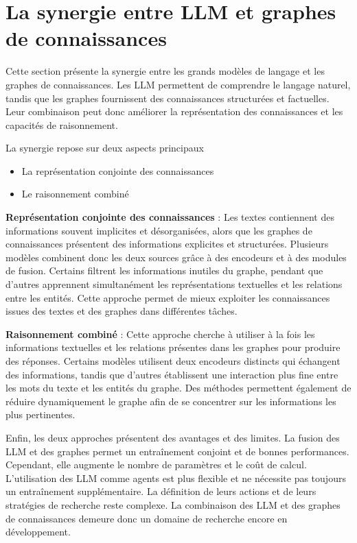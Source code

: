 \documentclass[12pt,a4paper]{report}
\begin{document}
\section{La synergie entre LLM et graphes de connaissances}
Cette section présente la synergie entre les grands modèles de langage et les graphes de 
connaissances. Les LLM permettent de comprendre le langage naturel, tandis que les graphes 
fournissent des connaissances structurées et factuelles. Leur combinaison peut donc améliorer 
la représentation des connaissances et les capacités de raisonnement.

La synergie repose sur deux aspects principaux 
\begin{itemize}
    \item La représentation conjointe des connaissances 
    \item Le raisonnement combiné
\end{itemize}

\textbf{Représentation conjointe des connaissances} :
Les textes contiennent des informations souvent implicites et désorganisées, 
alors que les graphes de connaissances présentent des informations explicites 
et structurées. Plusieurs modèles combinent donc les deux sources grâce à des 
encodeurs et à des modules de fusion. Certains filtrent les informations inutiles 
du graphe, pendant que d'autres apprennent simultanément les représentations textuelles 
et les relations entre les entités. Cette approche permet de mieux exploiter les 
connaissances issues des textes et des graphes dans différentes tâches.

\textbf{Raisonnement combiné} :
Cette approche cherche à utiliser à la fois les informations textuelles et 
les relations présentes dans les graphes pour produire des réponses. 
Certains modèles utilisent deux encodeurs distincts qui échangent des 
informations, tandis que d'autres établissent une interaction plus fine 
entre les mots du texte et les entités du graphe. Des méthodes permettent 
également de réduire dynamiquement le graphe afin de se concentrer sur les 
informations les plus pertinentes.

Enfin, les deux approches présentent des avantages et des limites. La fusion des LLM 
et des graphes permet un entraînement conjoint et de bonnes performances. Cependant, 
elle augmente le nombre de paramètres et le coût de calcul. L'utilisation des LLM comme 
agents est plus flexible et ne nécessite pas toujours un entraînement supplémentaire. 
La définition de leurs actions et de leurs stratégies de recherche reste complexe. 
La combinaison des LLM et des graphes de connaissances demeure donc un domaine de 
recherche encore en développement.
\end{document}
